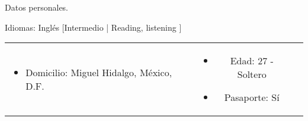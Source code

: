 \documentclass{resume} %
\begin{document}

\begin{rSection}{Datos personales.}

    Idiomas: Inglés [Intermedio | Reading, listening ]

    \begin{tabular}{l c r}
        \parbox{0.5\textwidth}{
            \begin{itemize}
                \item Domicilio: Miguel Hidalgo, México, D.F.
            \end{itemize}
        } &
        \parbox{0.4\textwidth}{
            \begin{itemize}
                \item Edad: 27 - Soltero
                \item Pasaporte: Sí
            \end{itemize}
        }
    \end{tabular}
    \\
\end{rSection}

\end{document}
